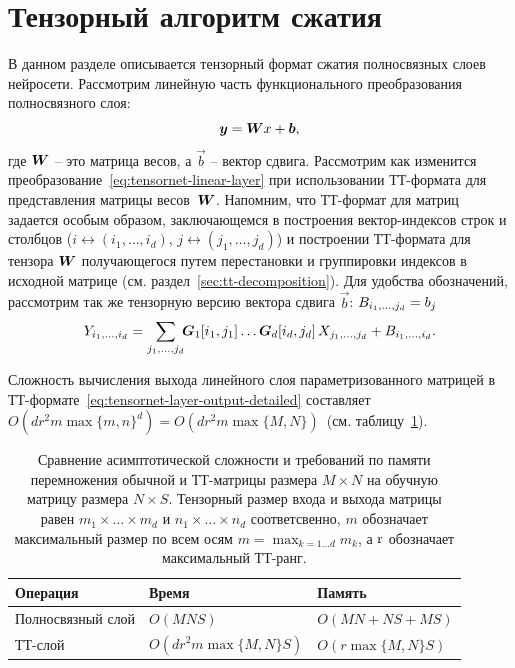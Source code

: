 \section{Тензорный алгоритм сжатия} \label{sec:tensornet-tt-cnn}
В данном разделе описывается тензорный формат сжатия полносвязных слоев нейросети. Рассмотрим линейную часть функционального преобразования полносвязного слоя:
\begin{equation}
  \label{eq:tensornet-linear-layer}
  \boldsymbol{y} = \boldsymbol{W} x + \boldsymbol{b},
\end{equation}
где $\boldsymbol{W}$ -- это матрица весов, а $\vec{b}$ -- вектор сдвига.
Рассмотрим как изменится преобразование~\ref{eq:tensornet-linear-layer} при использовании ТТ-формата для представления матрицы весов~$\boldsymbol{W}$. Напомним, что ТТ-формат для матриц задается особым образом, заключающемся в построения вектор-индексов строк и столбцов ($i \leftrightarrow (i_1, \ldots, i_d)$, $j \leftrightarrow (j_1, \ldots, j_d)$) и построении ТТ-формата для тензора $\boldsymbol{W}$ получающегося путем перестановки и группировки индексов в исходной матрице (см. раздел~\ref{sec:tt-decomposition}).
Для удобства обозначений, рассмотрим так же тензорную версию вектора сдвига $\vec{b}$: $B_{i_1, \ldots, j_d} = b_j$
\begin{equation}
\label{eq:tensornet-layer-output-detailed}
Y_{i_1, \ldots, i_d} =
\sum_{j_1, \ldots, j_d}  \!\!\boldsymbol{G}_1[i_1, j_1] \dots \boldsymbol{G}_d[i_d, j_d]\, X_{j_1,\ldots,j_d} + B_{i_1,\ldots,i_d}.
\end{equation}

Сложность вычисления выхода линейного слоя параметризованного матрицей в ТТ-формате~\eqref{eq:tensornet-layer-output-detailed} составляет $O(d r^2 m \max\{m, n\}^d) = O(d r^2 m \max\{M, N\})$~(см. таблицу~\ref{tbl:complexity-comparison}).


\begin{table}\begin{center}
    \begin{tabular}{ l | l | l }
    Операция & Время & Память \rule{0pt}{1.0\normalbaselineskip} \\ \hline
    Полносвязный слой & $O(M N S)$ & $O(M N + N S + M S)$ \rule{0pt}{1.0\normalbaselineskip}\\ %
    ТТ-слой & $O(d r^2 m \max\{M, N\} S)$ & $O(r \max\{M, N\} S)$ \\ %
    \end{tabular}
    \end{center}
    \caption{Сравнение асимптотической сложности и требований по памяти перемножения обычной и ТТ-матрицы размера $M \times N$ на обучную матрицу размера $N \times S$. Тензорный размер входа и выхода матрицы равен $m_1 \times \ldots \times m_d$ и $n_1 \times \ldots \times n_d$ соответсвенно, $m$ обозначает максимальный размер по всем осям $m = \max_{k = 1 \ldots d} m_k$, а $\operatorname{r}$ обозначает максимальный ТТ-ранг. \label{tbl:complexity-comparison}}
\end{table}


